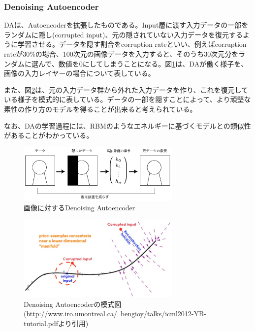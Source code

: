 \subsubsection{Denoising Autoencoder}
DAは、Autoencoderを拡張したものである。Input層に渡す入力データの一部をランダムに隠し(corrupted input)、元の隠されていない入力データを復元するように学習させる。データを隠す割合をcorruption rateといい、例えばcorruption rateが30\%の場合、100次元の画像データを入力すると、そのうち30次元分をランダムに選んで、数値を0にしてしまうことになる。図\ref{c3_da_pic}は、DAが働く様子を、画像の入力レイヤーの場合について表している。\par
また、図\ref{c3_da}は、元の入力データ群から外れた入力データを作り、これを復元している様子を模式的に表している。データの一部を隠すことによって、より頑堅な素性の作り方のモデルを得ることが出来ると考えられている。\par
なお、DAの学習過程には、RBMのようなエネルギーに基づくモデルとの類似性があることがわかっている\cite{vincent2011a-connection}。
\begin{figure}[tbp]
 \begin{center}
  \includegraphics[width=80mm]{img/c3/da_pic}
 \end{center}
 \caption{画像に対するDenoising Autoencoder}
 \label{c3_da_pic}
\end{figure}
\begin{figure}[tbp]
 \begin{center}
  \includegraphics[width=80mm]{img/c3/da}
 \end{center}
 \caption{Denoising Autoencoderの模式図 (http://www.iro.umontreal.ca/~bengioy/talks/icml2012-YB-tutorial.pdfより引用)}
 \label{c3_da}
\end{figure}

